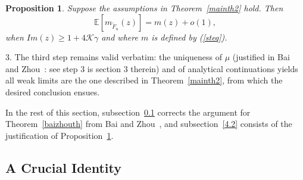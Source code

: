 \documentclass{article}
\newtheorem{proposition}{Proposition}
\numberwithin{equation}{section}
\begin{document}
\begin{proposition}\label{propstep2e}
     Suppose the assumptions in Theorem~\ref{mainth2} hold. %
     Then %
     \begin{equation}
         \mathbb{E}[m_{\tilde{F}_n}(z)]=m(z)+o(1),
     \end{equation}
     when \(Im(z) \geq 1+4\mathcal{K}\gamma\) and where \(m\) is defined by (\ref{steq}).
\end{proposition}


\par
\(3.\) The third step remains valid verbatim: the uniqueness of \(\mu\) (justified in Bai and Zhou~\cite{baizhou}: see step \(3\) is section \(3\) therein) and of analytical continuations yields all weak limits are the one described in Theorem~\ref{mainth2}, from which the desired conclusion ensues.
\par
In the rest of this section, subsection~\ref{4.1} corrects the argument for Theorem~\ref{baizhouth} from Bai and Zhou~\cite{baizhou}, and subsection~\ref{4.2} consists of the justification of Proposition~\ref{propstep2e}.

\subsection{A Crucial Identity}\label{4.1}
\end{document}

